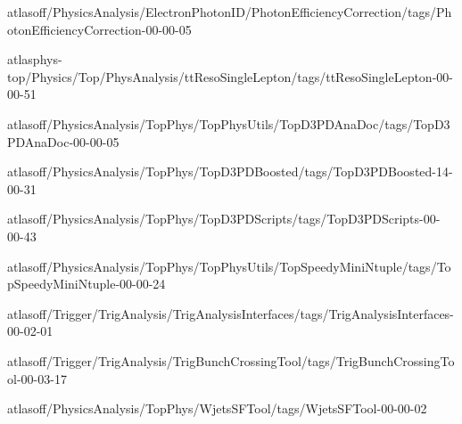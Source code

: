 atlasoff/PhysicsAnalysis/ElectronPhotonID/PhotonEfficiencyCorrection/tags/PhotonEfficiencyCorrection-00-00-05

atlasphys-top/Physics/Top/PhysAnalysis/ttResoSingleLepton/tags/ttResoSingleLepton-00-00-51

atlasoff/PhysicsAnalysis/TopPhys/TopPhysUtils/TopD3PDAnaDoc/tags/TopD3PDAnaDoc-00-00-05

atlasoff/PhysicsAnalysis/TopPhys/TopD3PDBoosted/tags/TopD3PDBoosted-14-00-31

atlasoff/PhysicsAnalysis/TopPhys/TopD3PDScripts/tags/TopD3PDScripts-00-00-43

atlasoff/PhysicsAnalysis/TopPhys/TopPhysUtils/TopSpeedyMiniNtuple/tags/TopSpeedyMiniNtuple-00-00-24

atlasoff/Trigger/TrigAnalysis/TrigAnalysisInterfaces/tags/TrigAnalysisInterfaces-00-02-01

atlasoff/Trigger/TrigAnalysis/TrigBunchCrossingTool/tags/TrigBunchCrossingTool-00-03-17

atlasoff/PhysicsAnalysis/TopPhys/WjetsSFTool/tags/WjetsSFTool-00-00-02

\normalsize
